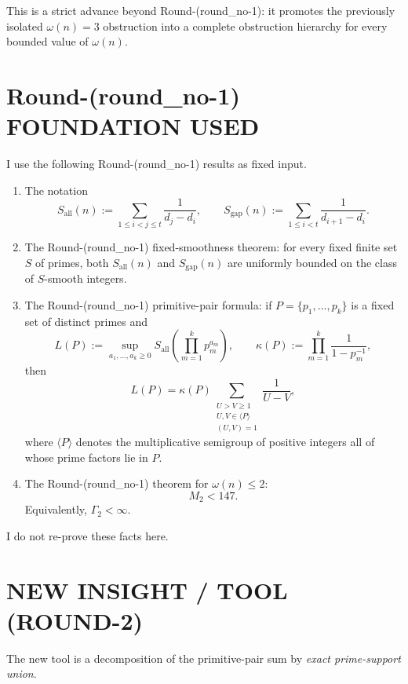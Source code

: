 This is a strict advance beyond Round-(round\_no-1): it promotes the previously isolated \(\omega(n)=3\) obstruction into a complete obstruction hierarchy for every bounded value of \(\omega(n)\).

\section{Round-(round\_no-1) FOUNDATION USED}

I use the following Round-(round\_no-1) results as fixed input.

\begin{enumerate}
\item The notation
\[
S_{\mathrm{all}}(n):=\sum_{1\le i<j\le t}\frac{1}{d_j-d_i},
\qquad
S_{\mathrm{gap}}(n):=\sum_{1\le i<t}\frac{1}{d_{i+1}-d_i}.
\]

\item The Round-(round\_no-1) fixed-smoothness theorem: for every fixed finite set \(S\) of primes, both \(S_{\mathrm{all}}(n)\) and \(S_{\mathrm{gap}}(n)\) are uniformly bounded on the class of \(S\)-smooth integers.

\item The Round-(round\_no-1) primitive-pair formula: if \(P=\{p_1,\dots,p_k\}\) is a fixed set of distinct primes and
\[
L(P):=\sup_{a_1,\dots,a_k\ge 0} S_{\mathrm{all}}\!\left(\prod_{m=1}^{k}p_m^{a_m}\right),
\qquad
\kappa(P):=\prod_{m=1}^{k}\frac{1}{1-p_m^{-1}},
\]
then
\[
L(P)=\kappa(P)
\sum_{\substack{U>V\ge 1\\ U,V\in\langle P\rangle\\ (U,V)=1}}
\frac{1}{U-V},
\]
where \(\langle P\rangle\) denotes the multiplicative semigroup of positive integers all of whose prime factors lie in \(P\).

\item The Round-(round\_no-1) theorem for \(\omega(n)\le 2\):
\[
M_2<147.
\]
Equivalently, \(\Gamma_2<\infty\).
\end{enumerate}

I do not re-prove these facts here.

\section{NEW INSIGHT / TOOL (ROUND-2)}

The new tool is a decomposition of the primitive-pair sum by \emph{exact prime-support union}.

